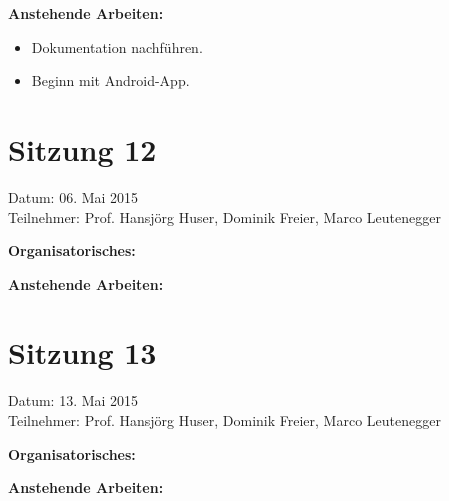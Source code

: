 	\textbf{Anstehende Arbeiten:}
	\begin{itemize}
		\item Dokumentation nachführen.
		\item Beginn mit Android-App.
	\end{itemize}

\section*{Sitzung 12}
	Datum: 06. Mai 2015 \\
	Teilnehmer: Prof. Hansjörg Huser, Dominik Freier, Marco Leutenegger

	\textbf{Organisatorisches:}

	\textbf{Anstehende Arbeiten:}
	
\section*{Sitzung 13}
	Datum: 13. Mai 2015 \\
	Teilnehmer: Prof. Hansjörg Huser, Dominik Freier, Marco Leutenegger

	\textbf{Organisatorisches:}

	\textbf{Anstehende Arbeiten:}